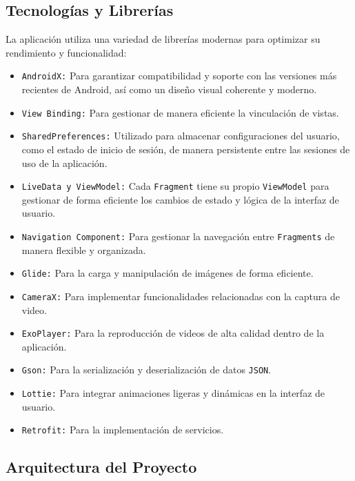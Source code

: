 
\subsection{Tecnologías y Librerías}

La aplicación utiliza una variedad de librerías modernas para optimizar su rendimiento y funcionalidad:

\begin{itemize}
    \item \texttt{AndroidX:} Para garantizar compatibilidad y soporte con las versiones más recientes de Android, así como un diseño visual coherente y moderno.
    \item \texttt{View Binding:} Para gestionar de manera eficiente la vinculación de vistas.
    \item \texttt{SharedPreferences:} Utilizado para almacenar configuraciones del usuario, como el estado de inicio de sesión, de manera persistente entre las sesiones de uso de la aplicación.
    \item \texttt{LiveData y ViewModel:} Cada  \texttt{Fragment} tiene su propio  \texttt{ViewModel} para gestionar de forma eficiente los cambios de estado y lógica de la interfaz de usuario.
    \item \texttt{Navigation Component:} Para gestionar la navegación entre  \texttt{Fragments} de manera flexible y organizada.
    \item \texttt{Glide:} Para la carga y manipulación de imágenes de forma eficiente.
    \item \texttt{CameraX:} Para implementar funcionalidades relacionadas con la captura de video.
    \item \texttt{ExoPlayer:} Para la reproducción de videos de alta calidad dentro de la aplicación.
    \item \texttt{Gson:} Para la serialización y deserialización de datos \texttt{JSON}.
    \item \texttt{Lottie:} Para integrar animaciones ligeras y dinámicas en la interfaz de usuario.
    \item \texttt{Retrofit:} Para la implementación de servicios. 
\end{itemize}


\subsection{Arquitectura del Proyecto}

